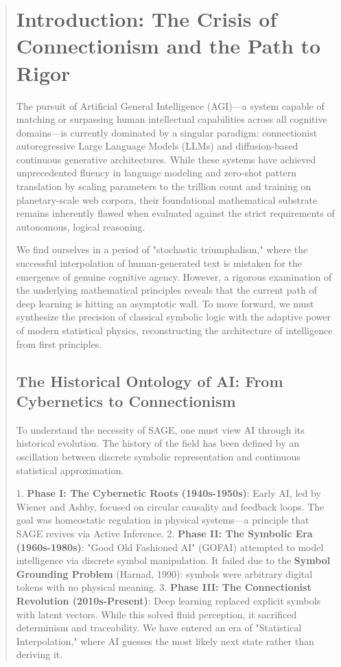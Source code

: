 \documentclass[10pt,twocolumn,letterpaper]{article}
\begin{document}
\begin{abstract}
\section{Introduction: The Crisis of Connectionism and the Path to Rigor}

The pursuit of Artificial General Intelligence (AGI)—a system capable of matching or surpassing human intellectual capabilities across all cognitive domains—is currently dominated by a singular paradigm: connectionist autoregressive Large Language Models (LLMs) and diffusion-based continuous generative architectures. While these systems have achieved unprecedented fluency in language modeling and zero-shot pattern translation by scaling parameters to the trillion count and training on planetary-scale web corpora, their foundational mathematical substrate remains inherently flawed when evaluated against the strict requirements of autonomous, logical reasoning.

We find ourselves in a period of "stochastic triumphalism," where the successful interpolation of human-generated text is mistaken for the emergence of genuine cognitive agency. However, a rigorous examination of the underlying mathematical principles reveals that the current path of deep learning is hitting an asymptotic wall. To move forward, we must synthesize the precision of classical symbolic logic with the adaptive power of modern statistical physics, reconstructing the architecture of intelligence from first principles.

\subsection{The Historical Ontology of AI: From Cybernetics to Connectionism}

To understand the necessity of SAGE, one must view AI through its historical evolution. The history of the field has been defined by an oscillation between discrete symbolic representation and continuous statistical approximation.

1.  \textbf{Phase I: The Cybernetic Roots (1940s-1950s)}: Early AI, led by Wiener and Ashby, focused on circular causality and feedback loops. The goal was homeostatic regulation in physical systems—a principle that SAGE revives via Active Inference.
2.  \textbf{Phase II: The Symbolic Era (1960s-1980s)}: "Good Old Fashioned AI" (GOFAI) attempted to model intelligence via discrete symbol manipulation. It failed due to the \textbf{Symbol Grounding Problem} (Harnad, 1990): symbols were arbitrary digital tokens with no physical meaning.
3.  \textbf{Phase III: The Connectionist Revolution (2010s-Present)}: Deep learning replaced explicit symbols with latent vectors. While this solved fluid perception, it sacrificed determinism and traceability. We have entered an era of "Statistical Interpolation," where AI guesses the most likely next state rather than deriving it.


\end{abstract}
\end{document}

